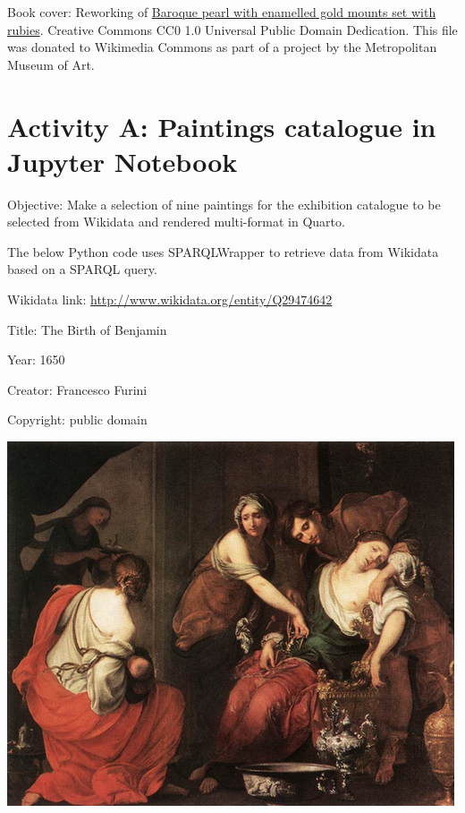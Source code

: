 \documentclass[
  letterpaper,
]{book}
\begin{document}
Book cover: Reworking of
\href{https://en.wikipedia.org/wiki/File:Pendant_in_the_form_of_a_siren_MET_DT7173.jpg}{Baroque
pearl with enamelled gold mounts set with rubies}. Creative Commons CC0
1.0 Universal Public Domain Dedication. This file was donated to
Wikimedia Commons as part of a project by the Metropolitan Museum of
Art.


\hypertarget{activity-a-paintings-catalogue-in-jupyter-notebook}{%
\chapter{Activity A: Paintings catalogue in Jupyter
Notebook}\label{activity-a-paintings-catalogue-in-jupyter-notebook}}

Objective: Make a selection of nine paintings for the exhibition
catalogue to be selected from Wikidata and rendered multi-format in
Quarto.

The below Python code uses SPARQLWrapper to retrieve data from Wikidata
based on a SPARQL query.

Wikidata link: \url{http://www.wikidata.org/entity/Q29474642}

Title: The Birth of Benjamin

Year: 1650

Creator: Francesco Furini

Copyright: public domain

\includegraphics{./paintings_files/figure-pdf/cell-2-output-2.png}
\end{document}
